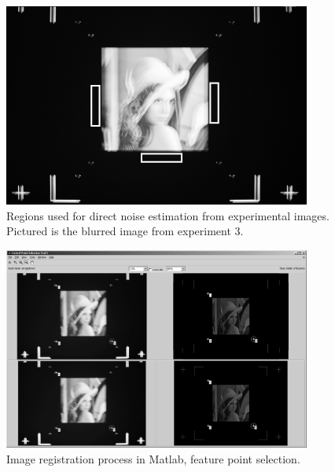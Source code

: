 \documentclass[12pt,notitlepage]{report}
\begin{document}
\begin{figure}[h]
 \centering
  \includegraphics[width=0.9\textwidth]{noise_estimation_regions.png}
 \caption[Regions used for direct noise estimation from experimental images]{Regions used for direct noise estimation from experimental images. Pictured is the blurred image from experiment 3.}
 \label{fig:noise_estimation_regions}
\end{figure}


\begin{figure}[h]
 \centering
  \includegraphics[width=0.9\textwidth]{registration_process.png}
 \caption[Image registration process in Matlab, feature point selection]{Image registration process in Matlab, feature point selection.}
 \label{fig:registration_process}
\end{figure}
\end{document}
